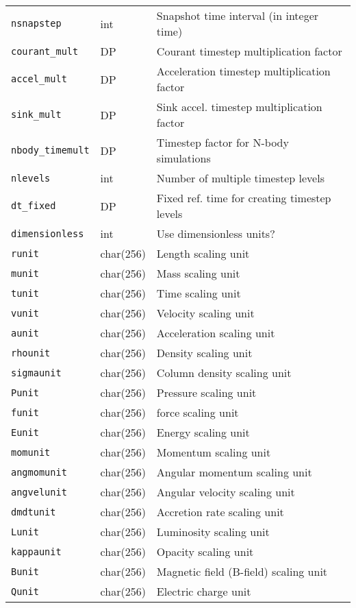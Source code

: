 \documentclass[a4paper]{article}
\newcommand{\var}[1]{\texttt{#1}}
\begin{document}
\begin{center}
\begin{supertabular}{|p{3cm}|p{2cm}|p{8cm}|}
\var{nsnapstep}  & int       & Snapshot time interval (in integer time) \\
\var{courant\_mult} & DP     & Courant timestep multiplication factor \\
\var{accel\_mult} & DP       & Acceleration timestep multiplication factor \\
\var{sink\_mult} & DP        & Sink accel. timestep multiplication factor \\
\var{nbody\_timemult} & DP   & Timestep factor for N-body simulations \\
\var{nlevels}    & int       & Number of multiple timestep levels \\
\var{dt\_fixed}  & DP        & Fixed ref. time for creating timestep levels \\ \hline
\var{dimensionless} & int    & Use dimensionless units? \\
\var{runit}      & char(256) & Length scaling unit \\
\var{munit}      & char(256) & Mass scaling unit \\
\var{tunit}      & char(256) & Time scaling unit \\
\var{vunit}      & char(256) & Velocity scaling unit \\
\var{aunit}      & char(256) & Acceleration scaling unit \\
\var{rhounit}    & char(256) & Density scaling unit \\
\var{sigmaunit}  & char(256) & Column density scaling unit \\
\var{Punit}      & char(256) & Pressure scaling unit \\
\var{funit}      & char(256) & force scaling unit \\
\var{Eunit}      & char(256) & Energy scaling unit \\
\var{momunit}    & char(256) & Momentum scaling unit \\
\var{angmomunit} & char(256) & Angular momentum scaling unit \\
\var{angvelunit} & char(256) & Angular velocity scaling unit \\
\var{dmdtunit}   & char(256) & Accretion rate scaling unit \\
\var{Lunit}      & char(256) & Luminosity scaling unit \\
\var{kappaunit}  & char(256) & Opacity scaling unit \\
\var{Bunit}      & char(256) & Magnetic field (B-field) scaling unit \\
\var{Qunit}      & char(256) & Electric charge unit \\

\end{supertabular}
\end{center}
\end{document}
